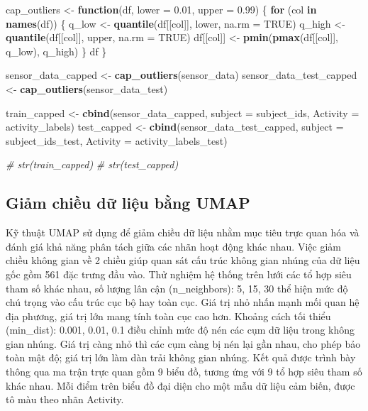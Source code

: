 \documentclass[
]{article}
\newenvironment{Shaded}{\begin{snugshade}}{\end{snugshade}}
\newcommand{\AttributeTok}[1]{\textcolor[rgb]{0.13,0.29,0.53}{#1}}
\newcommand{\CommentTok}[1]{\textcolor[rgb]{0.56,0.35,0.01}{\textit{#1}}}
\newcommand{\ConstantTok}[1]{\textcolor[rgb]{0.56,0.35,0.01}{#1}}
\newcommand{\ControlFlowTok}[1]{\textcolor[rgb]{0.13,0.29,0.53}{\textbf{#1}}}
\newcommand{\FloatTok}[1]{\textcolor[rgb]{0.00,0.00,0.81}{#1}}
\newcommand{\FunctionTok}[1]{\textcolor[rgb]{0.13,0.29,0.53}{\textbf{#1}}}
\newcommand{\NormalTok}[1]{#1}
\newcommand{\OtherTok}[1]{\textcolor[rgb]{0.56,0.35,0.01}{#1}}
\begin{document}
\begin{Shaded}
\begin{Highlighting}[]
\NormalTok{ cap\_outliers }\OtherTok{\textless{}{-}} \ControlFlowTok{function}\NormalTok{(df, }\AttributeTok{lower =} \FloatTok{0.01}\NormalTok{, }\AttributeTok{upper =} \FloatTok{0.99}\NormalTok{) \{}
   \ControlFlowTok{for}\NormalTok{ (col }\ControlFlowTok{in} \FunctionTok{names}\NormalTok{(df)) \{}
\NormalTok{     q\_low }\OtherTok{\textless{}{-}} \FunctionTok{quantile}\NormalTok{(df[[col]], lower, }\AttributeTok{na.rm =} \ConstantTok{TRUE}\NormalTok{)}
\NormalTok{     q\_high }\OtherTok{\textless{}{-}} \FunctionTok{quantile}\NormalTok{(df[[col]], upper, }\AttributeTok{na.rm =} \ConstantTok{TRUE}\NormalTok{)}
\NormalTok{     df[[col]] }\OtherTok{\textless{}{-}} \FunctionTok{pmin}\NormalTok{(}\FunctionTok{pmax}\NormalTok{(df[[col]], q\_low), q\_high)}
\NormalTok{   \}}
\NormalTok{   df}
\NormalTok{ \}}

\NormalTok{ sensor\_data\_capped }\OtherTok{\textless{}{-}} \FunctionTok{cap\_outliers}\NormalTok{(sensor\_data)}
\NormalTok{ sensor\_data\_test\_capped }\OtherTok{\textless{}{-}} \FunctionTok{cap\_outliers}\NormalTok{(sensor\_data\_test)}

\NormalTok{ train\_capped }\OtherTok{\textless{}{-}} \FunctionTok{cbind}\NormalTok{(sensor\_data\_capped, }\AttributeTok{subject =}\NormalTok{ subject\_ids, }\AttributeTok{Activity =}\NormalTok{ activity\_labels)}
\NormalTok{ test\_capped }\OtherTok{\textless{}{-}} \FunctionTok{cbind}\NormalTok{(sensor\_data\_test\_capped, }\AttributeTok{subject =}\NormalTok{ subject\_ids\_test, }\AttributeTok{Activity =}\NormalTok{ activity\_labels\_test)}

\CommentTok{\# str(train\_capped)}
\CommentTok{\# str(test\_capped)}
\end{Highlighting}
\end{Shaded}

\subsection{Giảm chiều dữ liệu bằng
UMAP}\label{giux1ea3m-chiux1ec1u-dux1eef-liux1ec7u-bux1eb1ng-umap}

Kỹ thuật UMAP sử dụng để giảm chiều dữ liệu nhằm mục tiêu trực quan hóa
và đánh giá khả năng phân tách giữa các nhãn hoạt động khác nhau. Việc
giảm chiều không gian về 2 chiều giúp quan sát cấu trúc không gian nhúng
của dữ liệu gốc gồm 561 đặc trưng đầu vào. Thử nghiệm hệ thống trên lưới
các tổ hợp siêu tham số khác nhau, số lượng lân cận (n\_neighbors): 5,
15, 30 thể hiện mức độ chú trọng vào cấu trúc cục bộ hay toàn cục. Giá
trị nhỏ nhấn mạnh mối quan hệ địa phương, giá trị lớn mang tính toàn cục
cao hơn. Khoảng cách tối thiểu (min\_dist): 0.001, 0.01, 0.1 điều chỉnh
mức độ nén các cụm dữ liệu trong không gian nhúng. Giá trị càng nhỏ thì
các cụm càng bị nén lại gần nhau, cho phép bảo toàn mật độ; giá trị lớn
làm dàn trải không gian nhúng. Kết quả được trình bày thông qua ma trận
trực quan gồm 9 biểu đồ, tương ứng với 9 tổ hợp siêu tham số khác nhau.
Mỗi điểm trên biểu đồ đại diện cho một mẫu dữ liệu cảm biến, được tô màu
theo nhãn Activity.
\end{document}
